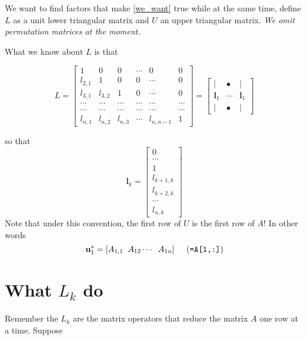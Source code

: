 \documentclass[12pt]{article}
\theoremstyle{definition}
\begin{document}
We want to find factors that make \eqref{we_want} true while at the same time, define $L$ as a unit lower triangular matrix and $U$ an upper triangular matrix. \textit{We omit permutation matrices at the moment.}

What we know about $L$ is that

\begin{equation}\label{L_structure}
L=\begin{bmatrix}
1 & 0  & 0 & \cdots & 0 & 0 \\ 
l_{2,1} & 1 & 0 & 0 &\cdots & 0 \\ 
l_{3,1} & l_{3,2} & 1 & 0 &\cdots & 0\\ 
\cdots & \cdots & \cdots  & \cdots&\cdots&\cdots \\
\cdots & \cdots & \cdots  & \cdots&\cdots&\cdots \\
l_{n,1} & l_{n,2} & l_{n,3} & \cdots & l_{n, n-1} & 1
\end{bmatrix} =\begin{bmatrix}
| & • & | \\ 
\mathbf{l}_1 & \cdots & \mathbf{l}_1 \\ 
| & • & |
\end{bmatrix}
\end{equation}

so that 
\begin{equation}
\mathbf{l}_k=
\begin{bmatrix}
0 \\ 
\cdots \\ 
1 \\ 
l_{k+1,k} \\ 
l_{k+2,k} \\ 
\cdots \\ 
l_{n,k}
\end{bmatrix} 
\end{equation}
Note that under this convention, the first row of $U$ is the first row of $A$! In other words
\begin{equation}
\mathbf{u}^*_1=[ A_{1,1}\;\; A_{12} \cdots \;\; A_{1n} ]\hspace{0.2in}(\text{\texttt{=A[1,:]}})
\end{equation}


\section{What $L_k$ do}

Remember the $L_k$ are the matrix operators that reduce the matrix $A$ one row at a time. Suppose 
\end{document}
